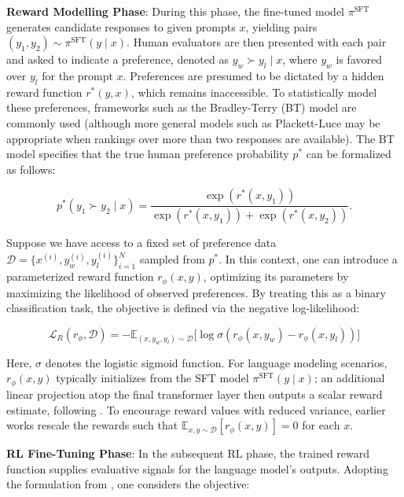 \textbf{Reward Modelling Phase}: During this phase, the fine-tuned model $\pi^\text{SFT}$ generates candidate responses to given prompts $x$, yielding pairs $(y_1, y_2)\sim \pi^\text{SFT}(y \mid x)$. Human evaluators are then presented with each pair and asked to indicate a preference, denoted as $y_w\succ y_l \mid x$, where $y_w$ is favored over $y_l$ for the prompt $x$. Preferences are presumed to be dictated by a hidden reward function $r^*(y, x)$, which remains inaccessible. To statistically model these preferences, frameworks such as the Bradley-Terry (BT) model \cite{bradley1952rankanalysis} are commonly used (although more general models such as Plackett-Luce \citep{plackett1975analysis, luce2012individual} may be appropriate when rankings over more than two responses are available). The BT model specifies that the true human preference probability $p^*$ can be formalized as follows:

\begin{equation}\label{eq:bradley-terry}
    p^*(y_1\succ y_2 \mid x)=\frac{\exp\left(r^*(x, y_1)\right)}{\exp\left(r^*(x, y_1)\right) + \exp\left(r^*(x, y_2)\right)}.
\end{equation}

Suppose we have access to a fixed set of preference data $\mathcal{D}=\bigl\{x^{(i)}, y_w^{(i)}, y_l^{(i)}\bigr\}_{i=1}^N$ sampled from $p^*$. In this context, one can introduce a parameterized reward function $r_{\phi}(x, y)$, optimizing its parameters by maximizing the likelihood of observed preferences. By treating this as a binary classification task, the objective is defined via the negative log-likelihood:

\begin{equation}\label{eq:reward_model}
    \mathcal{L}_R(r_{\phi}, \mathcal{D}) = -\mathbb{E}_{(x, y_w, y_l)\sim \mathcal{D}}\bigl[\log \sigma(r_{\phi}(x, y_w)- r_{\phi}(x, y_l))\bigr]
\end{equation}

Here, $\sigma$ denotes the logistic sigmoid function. For language modeling scenarios, $r_{\phi}(x, y)$ typically initializes from the SFT model $\pi^\text{SFT}(y \mid x)$; an additional linear projection atop the final transformer layer then outputs a scalar reward estimate, following \cite{ziegler2020finetuning}. To encourage reward values with reduced variance, earlier works rescale the rewards such that $\mathbb{E}_{x,y\sim \mathcal{D}}\left[r_\phi(x, y)\right] = 0$ for each $x$.

\textbf{RL Fine-Tuning Phase}: In the subsequent RL phase, the trained reward function supplies evaluative signals for the language model’s outputs. Adopting the formulation from \citep{jaques2017sequence, jaques2020human}, one considers the objective:

